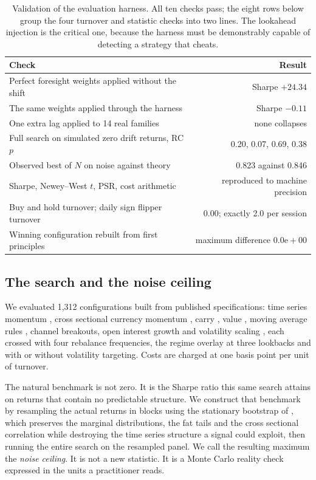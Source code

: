 \documentclass[10pt]{article}
\begin{document}
\begin{table}[H]
\caption{Validation of the evaluation harness. All ten checks pass; the eight rows below
group the four turnover and statistic checks into two lines. The lookahead injection is the
critical one, because the harness must be demonstrably capable of detecting a strategy that
cheats.}
\label{tab:harness}
\begin{tabularx}{\textwidth}{Lr}
\toprule
\textbf{Check} & \textbf{Result} \\
\midrule
Perfect foresight weights applied without the shift & Sharpe $+24.34$ \\
The same weights applied through the harness        & Sharpe $-0.11$ \\
One extra lag applied to 14 real families           & none collapses \\
Full search on simulated zero drift returns, RC $p$ & 0.20, 0.07, 0.69, 0.38 \\
Observed best of $N$ on noise against theory        & 0.823 against 0.846 \\
Sharpe, Newey--West $t$, PSR, cost arithmetic       & reproduced to machine precision \\
Buy and hold turnover; daily sign flipper turnover  & 0.00; exactly 2.0 per session \\
Winning configuration rebuilt from first principles & maximum difference $0.0\mathrm{e}{+}00$ \\
\bottomrule
\end{tabularx}
\end{table}

\subsection{The search and the noise ceiling}

We evaluated 1,312 configurations built from published specifications: time series momentum
\citep{moskowitz2012}, cross sectional currency momentum \citep{menkhoff2012}, carry
\citep{lustig2011,koijen2018}, value \citep{asness2013}, moving average rules
\citep{brock1992}, channel breakouts, open interest growth \citep{hongyogo2012} and
volatility scaling \citep{moreiramuir2017}, each crossed with four rebalance frequencies,
the regime overlay at three lookbacks and with or without volatility targeting. Costs are
charged at one basis point per unit of turnover.

The natural benchmark is not zero. It is the Sharpe ratio this same search attains on
returns that contain no predictable structure. We construct that benchmark by resampling
the actual returns in blocks using the stationary bootstrap of
\citet{politisromano1994}, which preserves the marginal distributions, the fat tails and
the cross sectional correlation while destroying the time series structure a signal could
exploit, then running the entire search on the resampled panel. We call the resulting
maximum the \emph{noise ceiling}. It is not a new statistic. It is a Monte Carlo reality
check expressed in the units a practitioner reads.
\end{document}
